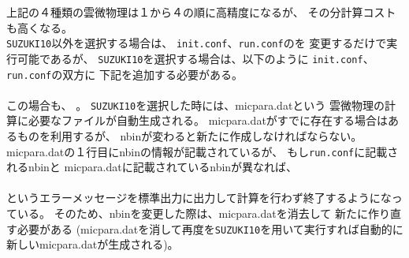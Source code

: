 上記の４種類の雲微物理は１から４の順に高精度になるが、
その分計算コストも高くなる。\\


\verb|SUZUKI10|以外を選択する場合は、
\verb|init.conf|、\verb|run.conf|のを
変更するだけで実行可能であるが、
{\color{red}\texttt{SUZUKI10}を選択する場合}は、以下のように
\verb|init.conf|、\verb|run.conf|の双方に
下記を追加する必要がある。\\

\\

この場合も、
{}。
\verb|SUZUKI10|を選択した時には、micpara.datという
雲微物理の計算に必要なファイルが自動生成される。
micpara.datがすでに存在する場合はあるものを利用するが、
nbinが変わると新たに作成しなければならない。
micpara.datの１行目にnbinの情報が記載されているが、
もし\verb|run.conf|に記載されるnbinと
micpara.datに記載されているnbinが異なれば、\\

\\

\noindent というエラーメッセージを標準出力に出力して計算を行わず終了するようになっている。
そのため、nbinを変更した際は、micpara.datを消去して
新たに作り直す必要がある
(micpara.datを消して再度\scalerm を\verb|SUZUKI10|を用いて実行すれば自動的に新しいmicpara.datが生成される)。



\subsection{\SubsecTurbulenceSetting} \label{subsec:basic_usel_turbulence}

